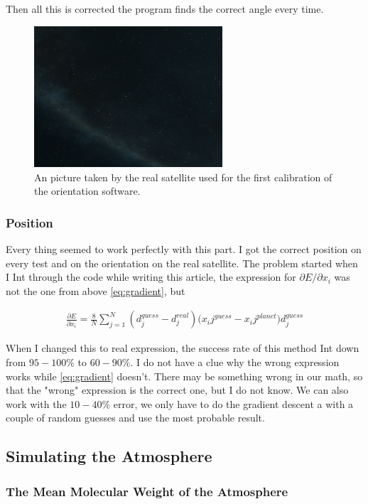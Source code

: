 \documentclass[a4paper, 10pt]{article}
\begin{document}
Then all this is corrected the program finds the correct angle every time.

\begin{figure}[H]
\centering
\includegraphics[width = 70mm]{find_orient.png}
\caption{An picture taken by the real satellite used for the first calibration of the orientation software.}
\end{figure}

\subsubsection{Position}

Every thing seemed to work perfectly with this part. I got the correct position on every test and on the orientation on the real satellite. The problem started when I Int through the code while writing this article, the expression for $\partial E / \partial x_i$ was not the one from above \ref{eq:gradient}, but 

\begin{align}\label{eq:gradient}
\frac{\partial E}{\partial x_i} = \frac{8}{N}\sum_{j=1}^N (d_j^{guess} - d_j^{real}){(x_ij^{guess} - x_ij^{planet}}){d_j^{guess}}
\end{align}

When I changed this to real expression, the success rate of this method Int down from $95-100\%$ to $60-90\%$. I do not have a clue why the wrong expression works while \ref{eq:gradient} doesn't. There may be something wrong in our math, so that the "wrong" expression is the correct one, but I do not know. We can also work with the $10-40 \%$ error, we only have to do the gradient descent a with a couple of random guesses and use the most probable result.

\subsection{Simulating the Atmosphere}
\subsubsection{The Mean Molecular Weight of the Atmosphere}
\end{document}
